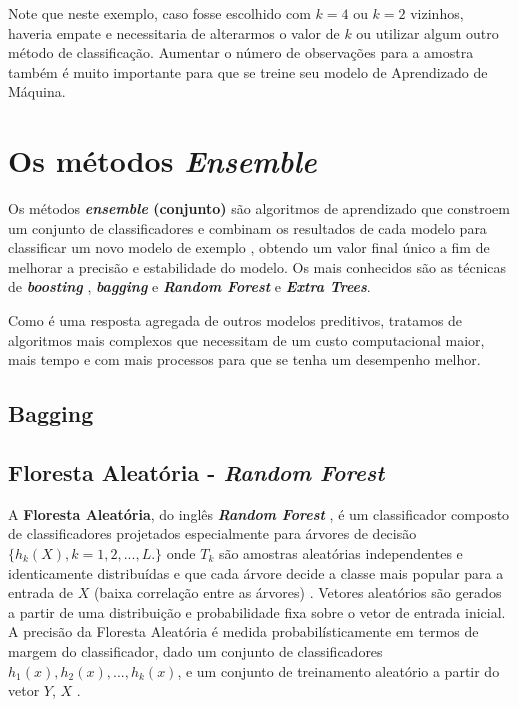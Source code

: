 \documentclass[
]{book}
\begin{document}
Note que neste exemplo, caso fosse escolhido com \(k=4\) ou \(k=2\) vizinhos, haveria empate e necessitaria de alterarmos o valor de \(k\) ou utilizar algum outro método de classificação. Aumentar o número de observações para a amostra também é muito importante para que se treine seu modelo de Aprendizado de Máquina.

\hypertarget{ptIII}{%
\chapter{\texorpdfstring{Os métodos \emph{Ensemble}}{Os métodos Ensemble}}\label{ptIII}}

Os métodos \textbf{\emph{ensemble} (conjunto)} são algoritmos de aprendizado que constroem um conjunto de classificadores e combinam os resultados de cada modelo para classificar um novo modelo de exemplo \citep{dietterich2000ensemble}, obtendo um valor final único a fim de melhorar a precisão e estabilidade do modelo. Os mais conhecidos são as técnicas de \textbf{\emph{boosting}} \citep{freund1996experiments}, \textbf{\emph{bagging}} \citep{breiman1996bagging} e \textbf{\emph{Random Forest}} \citep{breiman2001random, liaw2002classification} e \textbf{\emph{Extra Trees}}.

Como é uma resposta agregada de outros modelos preditivos, tratamos de algoritmos mais complexos que necessitam de um custo computacional maior, mais tempo e com mais processos para que se tenha um desempenho melhor.

\hypertarget{bagging}{%
\section{Bagging}\label{bagging}}

\hypertarget{rf}{%
\section{\texorpdfstring{Floresta Aleatória - \emph{Random Forest}}{Floresta Aleatória - Random Forest}}\label{rf}}

A \textbf{Floresta Aleatória}, do inglês \textbf{\emph{Random Forest}} \citep{breiman2001random, liaw2002classification}, é um classificador composto de classificadores projetados especialmente para árvores de decisão \(\{h_k(X),k=1,2,...,L.\}\) onde \(T_k\) são amostras aleatórias independentes e identicamente distribuídas e que cada árvore decide a classe mais popular para a entrada de \(X\) (baixa correlação entre as árvores) . Vetores aleatórios são gerados a partir de uma distribuição e probabilidade fixa sobre o vetor de entrada inicial. A precisão da Floresta Aleatória é medida probabilísticamente em termos de margem do classificador, dado um conjunto de classificadores \(h_1(x), h_2(x),...,h_k(x)\), e um conjunto de treinamento aleatório a partir do vetor \(Y\), \(X\) \citep{gomez2012random}.
\end{document}
